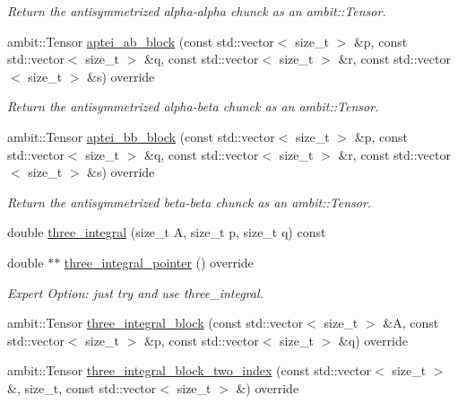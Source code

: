 \begin{DoxyCompactItemize}
\begin{DoxyCompactList}\small\item\em Return the antisymmetrized alpha-\/alpha chunck as an ambit\+::\+Tensor. \end{DoxyCompactList}\item 
ambit\+::\+Tensor \mbox{\hyperlink{classforte_1_1_cholesky_integrals_af9aff1a966a4e520aa4cc62afd1c6998}{aptei\+\_\+ab\+\_\+block}} (const std\+::vector$<$ size\+\_\+t $>$ \&p, const std\+::vector$<$ size\+\_\+t $>$ \&q, const std\+::vector$<$ size\+\_\+t $>$ \&r, const std\+::vector$<$ size\+\_\+t $>$ \&s) override
\begin{DoxyCompactList}\small\item\em Return the antisymmetrized alpha-\/beta chunck as an ambit\+::\+Tensor. \end{DoxyCompactList}\item 
ambit\+::\+Tensor \mbox{\hyperlink{classforte_1_1_cholesky_integrals_a87d158226e76e8897395384f78b3ce24}{aptei\+\_\+bb\+\_\+block}} (const std\+::vector$<$ size\+\_\+t $>$ \&p, const std\+::vector$<$ size\+\_\+t $>$ \&q, const std\+::vector$<$ size\+\_\+t $>$ \&r, const std\+::vector$<$ size\+\_\+t $>$ \&s) override
\begin{DoxyCompactList}\small\item\em Return the antisymmetrized beta-\/beta chunck as an ambit\+::\+Tensor. \end{DoxyCompactList}\item 
double \mbox{\hyperlink{classforte_1_1_cholesky_integrals_aba0bbed773557a5cce05d50e23d03c82}{three\+\_\+integral}} (size\+\_\+t A, size\+\_\+t p, size\+\_\+t q) const
\item 
double $\ast$$\ast$ \mbox{\hyperlink{classforte_1_1_cholesky_integrals_ac92cb7a11e5a027ba6ccd11181ddf61a}{three\+\_\+integral\+\_\+pointer}} () override
\begin{DoxyCompactList}\small\item\em Expert Option\+: just try and use three\+\_\+integral. \end{DoxyCompactList}\item 
ambit\+::\+Tensor \mbox{\hyperlink{classforte_1_1_cholesky_integrals_a73dccc944cd9fdb00626bc88390136bf}{three\+\_\+integral\+\_\+block}} (const std\+::vector$<$ size\+\_\+t $>$ \&A, const std\+::vector$<$ size\+\_\+t $>$ \&p, const std\+::vector$<$ size\+\_\+t $>$ \&q) override
\item 
ambit\+::\+Tensor \mbox{\hyperlink{classforte_1_1_cholesky_integrals_a4f07e4c8e13a3424ec6b3d3a4d59a258}{three\+\_\+integral\+\_\+block\+\_\+two\+\_\+index}} (const std\+::vector$<$ size\+\_\+t $>$ \&, size\+\_\+t, const std\+::vector$<$ size\+\_\+t $>$ \&) override
$$
\end{DoxyCompactItemize}
